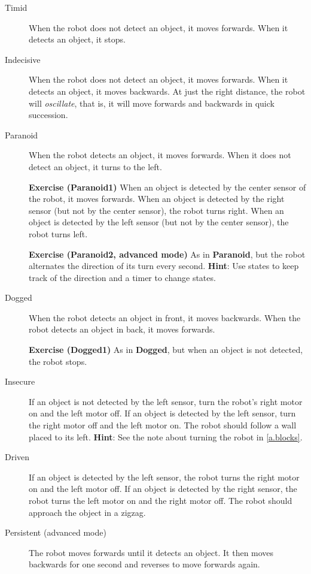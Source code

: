 \begin{description}

\item[Timid] When the robot does not detect an object, it moves forwards.
When it detects an object, it stops.

\item[Indecisive] When the robot does not detect an object, it moves
forwards. When it detects an object, it moves backwards. At just the
right distance, the robot will \emph{oscillate}, that is, it will move
forwards and backwards in quick succession.

\item[Paranoid] When the robot detects an object, it moves forwards. When
it does not detect an object, it turns to the left.

\textbf{Exercise (Paranoid1)} When an object is detected by the center
sensor of the robot, it moves forwards. When an object is detected by
the right sensor (but not by the center sensor), the robot turns right.
When an object is detected by the left sensor (but not by the center
sensor), the robot turns left.

\textbf{Exercise (Paranoid2, advanced mode)} As in \textbf{Paranoid}, but the
robot alternates the direction of its turn every second. \textbf{Hint}:
Use states to keep track of the direction and a timer to change states.

\item[Dogged] When the robot detects an object in front, it moves
backwards. When the robot detects an object in back, it moves forwards.

\textbf{Exercise (Dogged1)} As in \textbf{Dogged}, but when an
object is not detected, the robot stops.

\item[Insecure] If an object is not detected by the left sensor, turn the robot's right
motor on and the left motor off. If an object is detected by the left sensor, turn the
right motor off and the left motor on. The robot should follow a wall
placed to its left. \textbf{Hint}: See the note about turning the robot in \cref{a.blocks}.

\item[Driven] If an object is detected by the left sensor, the robot
turns the right motor on and the left motor off. If an object is
detected by the right sensor, the robot turns the left motor on and the
right motor off. The robot should approach the object in a zigzag.

\item[Persistent (advanced mode)] The robot moves forwards until it detects
an object. It then moves backwards for one second and reverses to move
forwards again.


\end{description}
